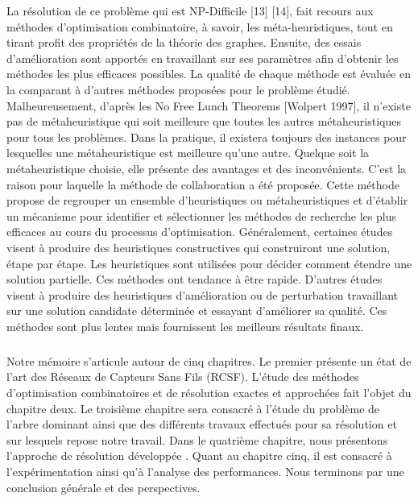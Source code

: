 La résolution de ce problème qui est NP-Difficile [13] [14], fait recours aux méthodes d’optimisation combinatoire, à savoir, les méta-heuristiques, tout en tirant profit des propriétés de la théorie des graphes. Ensuite, des essais d'amélioration sont apportés en travaillant sur ses paramètres afin d'obtenir les méthodes les plus efficaces possibles. La qualité de chaque méthode est évaluée en la comparant à d'autres méthodes proposées pour le problème étudié. Malheureusement, d'après les No Free Lunch Theorems [Wolpert 1997], il n'existe pas de métaheuristique qui soit meilleure que toutes les autres métaheuristiques pour tous les problèmes. Dans la pratique, il existera toujours des instances pour lesquelles une métaheuristique est meilleure qu'une autre. Quelque soit la métaheuristique choisie, elle présente des avantages et des inconvénients. C’est la raison pour laquelle la méthode de collaboration a été proposée. Cette méthode propose de regrouper un ensemble d'heuristiques ou métaheuristiques et d'établir un mécanisme pour identifier et sélectionner les méthodes de recherche les plus efficaces au cours du processus d'optimisation. Généralement, certaines études visent à produire des heuristiques constructives qui construiront une solution, étape par étape. Les heuristiques sont utilisées pour décider comment étendre une solution partielle. Ces méthodes ont tendance à être rapide. D'autres études visent à produire des heuristiques d'amélioration ou de perturbation travaillant sur une solution candidate déterminée et essayant d'améliorer sa qualité. Ces méthodes sont plus lentes mais fournissent les meilleurs résultats finaux. 

\subparagraph{}
Notre mémoire s’articule autour de cinq chapitres. Le premier présente un état de l’art des Réseaux de Capteurs Sans Fils (RCSF). L’étude des méthodes d’optimisation combinatoires et de résolution exactes et approchées fait l’objet du chapitre deux. Le troisième chapitre sera consacré à l’étude du problème de l’arbre dominant ainsi que des différents travaux effectués pour sa résolution et sur lesquels repose notre travail. Dans le quatrième chapitre, nous présentons l’approche de résolution développée . Quant au chapitre cinq, il est consacré à l’expérimentation ainsi qu’à l’analyse des
performances. Nous terminons par une conclusion générale et des perspectives.

